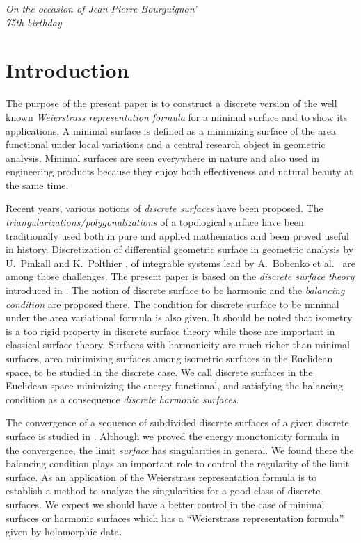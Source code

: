 \documentclass[pdftex]{sigma}
\newcommand{\1}{{\bf 1}}
\numberwithin{equation}{section}
\begin{document}
\begin{flushright}
\begin{minipage}{75mm}
\it On the occasion of Jean-Pierre Bourguignon'\\ 75th birthday
 \end{minipage}
\end{flushright}

\renewcommand{\thefootnote}{\arabic{footnote}}
\setcounter{footnote}{0}

\section{Introduction}
The purpose of the present paper is to construct a discrete version of the well known
{\em Weierstrass representation formula} for a minimal surface and to show its applications.
A minimal surface is defined as a minimizing surface of the area functional under local variations
and a central research object in geometric analysis.
Minimal surfaces are seen everywhere in nature and also used in engineering products
because they enjoy both effectiveness and natural beauty at the same time.

Recent years, various notions of {\em discrete surfaces} have been proposed.
The {\em triangularizations/polygonalizations} of a topological surface have been traditionally used
both in pure and applied mathematics and been proved useful in history.
Discretization of differential geometric surface in geometric analysis by U.~Pinkall and K.~Polthier
\cite{bobenko-pinkall, pinkall-polthier}, of integrable systems lead by A.~Bobenko et al.\
\cite{bobenko-bucking-sechelmann, bobenko-hoffmann, bobenko-pottmann-wallner}
are among those challenges.
The present paper is based on the {\em discrete surface theory} introduced in \cite{kotani-naito-omori}.
The notion of discrete surface to be harmonic and the {\em balancing condition} are proposed there.
The condition for discrete surface to be minimal under the area variational formula is also given.
It should be noted that isometry is a too rigid property in discrete surface theory while those are important in classical surface theory.
Surfaces with harmonicity are much richer than minimal surfaces,
area minimizing surfaces among isometric surfaces in the Euclidean space, to be studied in the discrete case.
We call discrete surfaces in the Euclidean space minimizing the energy functional,
and satisfying the balancing condition as a consequence {\em discrete harmonic surfaces}.

The convergence of a sequence of subdivided discrete surfaces of a given discrete surface is studied in \cite{kotani-naito-tao, tao}.
Although we proved the energy monotonicity formula in the convergence,
the limit {\em surface} has singularities in general.
We found there the balancing condition plays an important role to control the regularity of the limit surface.
As an application of the Weierstrass representation formula is to establish a method to analyze the singularities for a good class of discrete surfaces.
We expect we should have a better control in the case of minimal surfaces or harmonic surfaces which has a ``Weierstrass representation formula'' given by holomorphic data.
\end{document}

